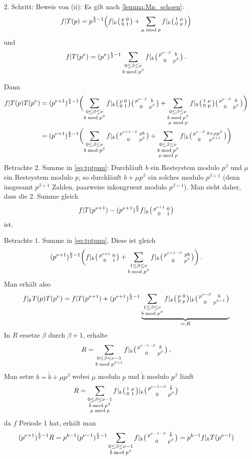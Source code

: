 \begin{bewe}
	
	2. Schritt: Beweis von (ii):
	Es gilt nach \autoref{lemma:Mn_schoen}:
	\[
	f|T(p) = p^{\frac{k}{2}-1} \Bigl(f|_k \mymat p001 + \sum_{\mu \bmod p} f|_k \mymat 1\mu0p \Bigr)
	\]
	und
	\[
	f|T(p^\nu) = (p^\nu)^{\frac{k}{2}-1} \sum_{\substack{0 \leq \beta \leq \nu \\ b \bmod p^\beta}} f|_k \mymat{p^{\nu-\beta}}b0{p^\beta}
	\,.
	\]
	
	Dann
	\begin{align}\label{eq:tptpnu}
	f|T(p)T(p^\nu)
	&= (p^{\nu+1})^{\frac{k}{2}-1} \biggl( \sum_{\substack{0 \leq \beta \leq \nu \\ b \bmod p^\beta}} f|_k \mymat p001 \mymat {p^{\nu-\beta}}b0{p^\beta} + \sum_{\substack{0 \leq \beta \leq \nu \\ b \bmod p^\beta \\ \mu\bmod p}} f|_k \mymat 1\mu0p \mymat {p^{\nu-\beta}}b0{p^\beta} \biggr) \nonumber \\
	&= (p^{\nu+1})^{\frac{k}{2}-1} \biggl( \sum_{\substack{0 \leq \beta \leq \nu\\b \bmod p^\beta}} f|_k \mymat {p^{\nu +1-\beta}}{pb}{0}{p^\beta} + \sum_{\substack{0 \leq \beta \leq \nu \\ b \bmod p^\beta \\ \mu \bmod p}} f|_k \mymat{p^{\nu-\beta}}{b+\mu p^\beta}0{p^{\beta+1}} \biggr)
	\end{align}
	Betrachte 2. Summe in \eqref{eq:tptpnu}:
	Durchläuft $b$ ein Restsystem modulo $p^\beta$ und $\mu$ ein Restsystem modulo $p$, so durchläuft $b+\mu p^\beta$ ein solches modulo $p^{\beta+1}$ (denn insgesamt $p^{\beta+1}$ Zahlen, paarweise inkongruent modulo $p^{\beta+1}$).
	Man sieht daher, dass die 2. Summe gleich
	\[
	f|T(p^{\nu+1}) - (p^{\nu+1})^{\frac{k}{2}} f|_k \mymat {p^{\nu+1}}001
	\]
	ist.
	
	Betrachte 1. Summe in \eqref{eq:tptpnu}. Diese ist gleich
	\[
	(p^{\nu + 1})^{\frac{k}{2}-1} \biggl(f|_k \mymat{p^{\nu+1}}001 + \sum_{\substack{1 \leq \beta \leq \nu \\ b \bmod p^\beta}} f|_k \mymat{p^{\nu+1-\beta}}{pb}0{p^\beta} \biggr)
	\,.
	\]
	Man erhält also
	\[
	f|_k T(p)T(p^\nu)
	= f|T(p^{\nu+1}) + (p^{\nu+1})^{\frac{k}{2}-1} \underbrace{\sum_{\substack{1 \leq \beta \leq \nu\\ b \bmod p^\beta}} f|_k \mymat p00p |_k \mymat {p^{\nu-\beta}}b0{p^{\beta-1}}
	}_{=: R}
	\]
	In $R$ ersetze $\beta$ durch $\beta + 1$, erhalte
	\[
	R = \sum_{\substack{0 \leq \beta \leq \nu-1\\ b \bmod p^{\beta+1} }} f|_k \mymat {p^{\nu-1-\beta}}b0{p^{\beta}}
	\,,
	\]
	Man setze $b = \tilde b + \mu p^\beta$ wobei $\mu$ modulo $p$ und $\tilde b$ modulo $p^\beta$ läuft
	\[
	R = \sum_{\substack{ 0 \leq \beta \leq \nu-1\\ \tilde b \bmod p^\beta \\ \mu \bmod p}} f|_k \mymat 1\mu01 |_k \mymat {p^{\nu-1-\beta}}{\tilde b}0{p^\beta}
	\]
	da $f$ Periode 1 hat, erhält man
	\[
	(p^{\nu+1})^{\frac{k}{2}-1}R
	= p^{k-1}(p^{\nu-1})^{\frac{k}{2}-1} \sum_{\substack{0 \leq \beta \leq \nu-1 \\ \tilde b \bmod p^\beta}} f|_k \mymat {p^{\nu-1-\beta}}{\tilde b}0{p^\beta}
	= p^{k-1} f|_kT(p^{\nu-1})
	\]
	

\end{bewe}
